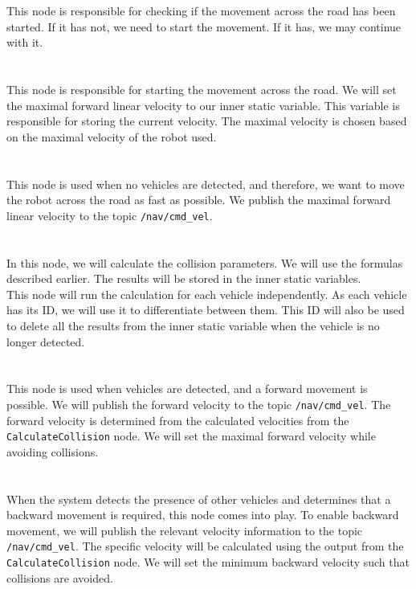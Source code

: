         This node is responsible for checking if the movement across the road has been started. If it has not, we need to start the movement. If it has, we may continue with it.\\\\
    \\
        This node is responsible for starting the movement across the road. We will set the maximal forward linear velocity to our inner static variable. This variable is responsible for storing the current velocity. The maximal velocity is chosen based on the maximal velocity of the robot used.\\\\
    \\
        This node is used when no vehicles are detected, and therefore, we want to move the robot across the road as fast as possible. We publish the maximal forward linear velocity to the topic \texttt{/nav/cmd\_vel}.\\\\
    \\
        In this node, we will calculate the collision parameters. We will use the formulas described earlier. The results will be stored in the inner static variables.\\
        This node will run the calculation for each vehicle independently. As each vehicle has its ID, we will use it to differentiate between them. This ID will also be used to delete all the results from the inner static variable when the vehicle is no longer detected.\\\\
    \\
        This node is used when vehicles are detected, and a forward movement is possible. We will publish the forward velocity to the topic \texttt{/nav/cmd\_vel}. The forward velocity is determined from the calculated velocities from the \texttt{CalculateCollision} node. We will set the maximal forward velocity while avoiding collisions.\\\\
    \\
        When the system detects the presence of other vehicles and determines that a backward movement is required, this node comes into play. To enable backward movement, we will publish the relevant velocity information to the topic \texttt{/nav/cmd\_vel}. The specific velocity will be calculated using the output from the \texttt{CalculateCollision} node. We will set the minimum backward velocity such that collisions are avoided.\\\\

